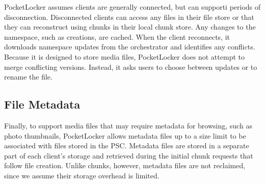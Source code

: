 PocketLocker assumes clients are generally connected, but can supporti periods
of disconnection. Disconnected clients can access any files in their file store
or that they can reconstruct using chunks in their local chunk store. Any
changes to the namespace, such as creations, are cached.  When the client
reconnects, it downloads namespace updates from the orchestrator and identifies
any conflicts. Because it is designed to store media files, PocketLocker does
not attempt to merge conflicting versions. Instead, it asks users to choose
between updates or to rename the file.

\subsection{File Metadata}

Finally, to support media files that may require metadata for browsing, such
as photo thumbnails, PocketLocker allows metadata files up to a size limit to
be associated with files stored in the PSC. Metadata files are stored in a
separate part of each client's storage and retrieved during the initial chunk
requests that follow file creation. Unlike chunks, however, metadata files
are not reclaimed, since we assume their storage overhead is limited.
